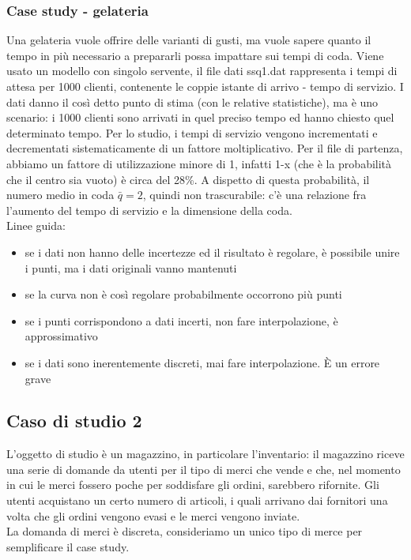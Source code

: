 \documentclass{article}
\begin{document}
\subsubsection{Case study - gelateria}
Una gelateria vuole offrire delle varianti di gusti, ma vuole sapere quanto il tempo in più necessario a prepararli possa impattare sui tempi di coda. Viene usato un modello con singolo servente, il file dati ssq1.dat rappresenta i tempi di attesa per 1000 clienti, contenente le coppie istante di arrivo - tempo di servizio. I dati danno il così detto punto di stima (con le relative statistiche), ma è uno scenario: i 1000 clienti sono arrivati in quel preciso tempo ed hanno chiesto quel determinato tempo. Per lo studio, i tempi di servizio vengono incrementati e decrementati sistematicamente di un fattore moltiplicativo. Per il file di partenza, abbiamo un fattore di utilizzazione minore di 1, infatti 1-x (che è la probabilità che il centro sia vuoto) è circa del 28\%. A dispetto di questa probabilità, il numero medio in coda $\bar{q} = 2$, quindi non trascurabile: c'è una relazione fra l'aumento del tempo di servizio e la dimensione della coda.\\ Linee guida:
\begin{itemize}
\item se i dati non hanno delle incertezze ed il risultato è regolare, è possibile unire i punti, ma i dati originali vanno mantenuti
\item se la curva non è così regolare probabilmente occorrono più punti
\item se i punti corrispondono a dati incerti, non fare interpolazione, è approssimativo
\item se i dati sono inerentemente discreti, mai fare interpolazione. È un errore grave
\end{itemize}
\subsection{Caso di studio 2}
L'oggetto di studio è un magazzino, in particolare l'inventario: il magazzino riceve una serie di domande da utenti per il tipo di merci che vende e che, nel momento in cui le merci fossero poche per soddisfare gli ordini, sarebbero  rifornite. Gli utenti acquistano un certo numero di articoli, i quali arrivano dai fornitori una volta che gli ordini vengono evasi e le merci vengono inviate.\\ La domanda di merci è discreta, consideriamo un unico tipo di merce per semplificare il case study.
\end{document}
